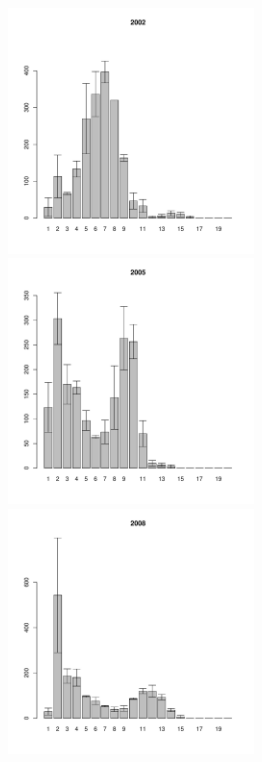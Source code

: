 \documentclass[12pt, a4paper]{article}
\begin{document}
\begin{figure}[h]
\begin{multicols}{3}
\hfill
\includegraphics[width=65mm]{../White_Sea/Estuatiy_Luvenga/sizestr_2002_.pdf}
\hfill
\includegraphics[width=65mm]{../White_Sea/Estuatiy_Luvenga/sizestr_2005_.pdf}
\hfill
\includegraphics[width=65mm]{../White_Sea/Estuatiy_Luvenga/sizestr_2008_.pdf}
\end{multicols}




\end{figure}
\end{document}

